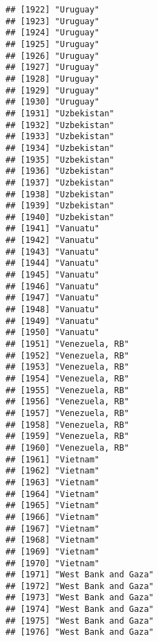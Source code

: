 \documentclass[]{article}
\begin{document}
\begin{verbatim}
## [1922] "Uruguay"                            
## [1923] "Uruguay"                            
## [1924] "Uruguay"                            
## [1925] "Uruguay"                            
## [1926] "Uruguay"                            
## [1927] "Uruguay"                            
## [1928] "Uruguay"                            
## [1929] "Uruguay"                            
## [1930] "Uruguay"                            
## [1931] "Uzbekistan"                         
## [1932] "Uzbekistan"                         
## [1933] "Uzbekistan"                         
## [1934] "Uzbekistan"                         
## [1935] "Uzbekistan"                         
## [1936] "Uzbekistan"                         
## [1937] "Uzbekistan"                         
## [1938] "Uzbekistan"                         
## [1939] "Uzbekistan"                         
## [1940] "Uzbekistan"                         
## [1941] "Vanuatu"                            
## [1942] "Vanuatu"                            
## [1943] "Vanuatu"                            
## [1944] "Vanuatu"                            
## [1945] "Vanuatu"                            
## [1946] "Vanuatu"                            
## [1947] "Vanuatu"                            
## [1948] "Vanuatu"                            
## [1949] "Vanuatu"                            
## [1950] "Vanuatu"                            
## [1951] "Venezuela, RB"                      
## [1952] "Venezuela, RB"                      
## [1953] "Venezuela, RB"                      
## [1954] "Venezuela, RB"                      
## [1955] "Venezuela, RB"                      
## [1956] "Venezuela, RB"                      
## [1957] "Venezuela, RB"                      
## [1958] "Venezuela, RB"                      
## [1959] "Venezuela, RB"                      
## [1960] "Venezuela, RB"                      
## [1961] "Vietnam"                            
## [1962] "Vietnam"                            
## [1963] "Vietnam"                            
## [1964] "Vietnam"                            
## [1965] "Vietnam"                            
## [1966] "Vietnam"                            
## [1967] "Vietnam"                            
## [1968] "Vietnam"                            
## [1969] "Vietnam"                            
## [1970] "Vietnam"                            
## [1971] "West Bank and Gaza"                 
## [1972] "West Bank and Gaza"                 
## [1973] "West Bank and Gaza"                 
## [1974] "West Bank and Gaza"                 
## [1975] "West Bank and Gaza"                 
## [1976] "West Bank and Gaza"                 

\end{verbatim}
\end{document}
